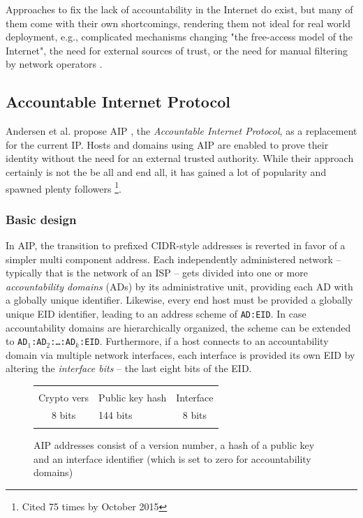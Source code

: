 \documentclass{acm_proc_article-sp}
\begin{document}
Approaches to fix the lack of accountability in the Internet do exist, but many of them come with their own shortcomings, rendering them not ideal for real world deployment, e.g., complicated mechanisms changing "the free-access model of the Internet", the need for external sources of trust, or the need for manual filtering by network operators \cite{aip}. 


\subsection{Accountable Internet Protocol}
\label{sec:aip}
Andersen et al. propose AIP \cite{aip}, the \emph{Accountable Internet Protocol}, as a replacement for the current IP. Hosts and domains using AIP are enabled to prove their identity without the need for an external trusted authority. While their approach certainly is not the be all and end all, it has gained a lot of popularity and spawned plenty followers \footnote{Cited 75 times by October 2015}.

\subsubsection{Basic design}
\label{sec:aipbd}

In AIP, the transition to prefixed CIDR-style addresses is reverted in favor of a simpler multi component address. Each independently administered network -- typically that is the network of an ISP -- gets divided into one or more \emph{accountability domains} (ADs) by its administrative unit, providing each AD with a globally unique identifier. Likewise, every end host must be provided a globally unique EID identifier, leading to an address scheme of \texttt{AD:EID}. In case accountability domains are hierarchically organized, the scheme can be extended to \texttt{AD$_1$:AD$_2$:\ldots:AD$_k$:EID}. Furthermore, if a host connects to an accountability domain via multiple network interfaces, each interface is provided its own EID by altering the \emph{interface bits} -- the last eight bits of the EID.

\begin{figure}[h!]
	\label{fig:aipadr}
	\begin{tabularx}{0.47\textwidth}{|c|C|c|}
		\hline & & \\
 		Crypto vers & Public key hash & Interface \\
		8 bits & 144 bits & 8 bits \\ & & \\
		\hline
	\end{tabularx}
	\caption{AIP addresses consist of a version number, a hash of a public key and an interface identifier 		(which is set to zero for accountability domains) \cite{aip}}
\end{figure}
\end{document}
